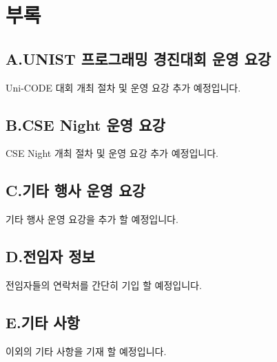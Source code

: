 \newpage
\section{부록}
\subsection{A.UNIST 프로그래밍 경진대회 운영 요강}
Uni-CODE 대회 개최 절차 및 운영 요강 추가 예정입니다.
\subsection{B.CSE Night 운영 요강}
CSE Night 개최 절차 및 운영 요강 추가 예정입니다.
\subsection{C.기타 행사 운영 요강}
기타 행사 운영 요강을 추가 할 예정입니다.
\subsection{D.전임자 정보}
전임자들의 연락처를 간단히 기입 할 예정입니다.
\subsection{E.기타 사항}
이외의 기타 사항을 기재 할 예정입니다.